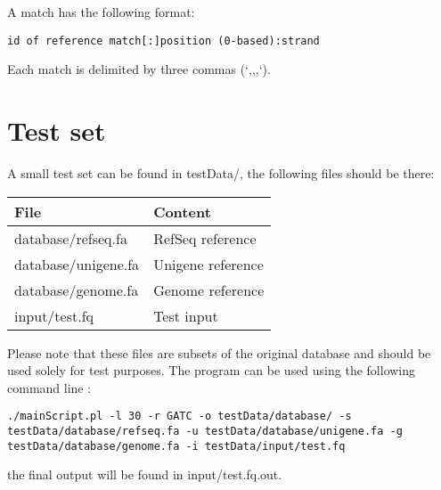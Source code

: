 \documentclass[a4paper,12pt]{article}
\begin{document}
A match has the following format: 
\begin{verbatim}
id of reference match[:]position (0-based):strand
\end{verbatim}

Each match is delimited by three commas (`,,,`). 

\section{Test set}

A small test set can be found in testData/, the following files should be there:
\begin{center}
\begin{tabular}{ll}
\hline
File  & Content \\
\hline
database/refseq.fa & RefSeq reference \\
database/unigene.fa & Unigene reference \\
database/genome.fa & Genome reference \\
input/test.fq    &  Test input \\
\hline
\end{tabular}
\end{center}


Please note that these files are subsets of the original database and should be used solely for test purposes. The program can be used using the following command line :
\begin{lstlisting}
./mainScript.pl -l 30 -r GATC -o testData/database/ -s testData/database/refseq.fa -u testData/database/unigene.fa -g testData/database/genome.fa -i testData/input/test.fq 
\end{lstlisting}

the final output will be found in input/test.fq.out.
\end{document}
